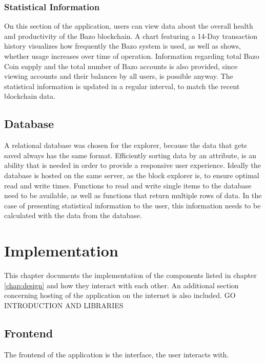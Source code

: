 \subsection{Statistical Information}
On this section of the application, users can view data about the overall health and productivity of the Bazo blockchain. A chart featuring a 14-Day transaction history visualizes how frequently the Bazo system is used, as well as shows, whether usage increases over time of operation. Information regarding total Bazo Coin supply and the total number of Bazo accounts is also provided, since viewing accounts and their balances by all users, is possible anyway. The statistical information is updated in a regular interval, to match the recent blockchain data.

\section{Database}
A relational database was chosen for the explorer, because the data that gets saved always has the same format. Efficiently sorting data by an attribute, is an ability that is needed in order to provide a responsive user experience. Ideally the database is hosted on the same server, as the block explorer is, to ensure optimal read and write times. Functions to read and write single items to the database need to be available, as well as functions that return multiple rows of data. In the case of presenting statistical information to the user, this information needs to be calculated with the data from the database.

\chapter{Implementation}
This chapter documents the implementation of the components listed in chapter \ref{chap:design} and how they interact with each other. An additional section concerning hosting of the application on the internet is also included. GO INTRODUCTION AND LIBRARIES
\section{Frontend}
The frontend of the application is the interface, the user interacts with. 
